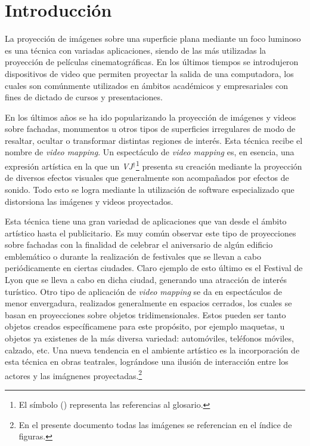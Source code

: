﻿\chapter{Introducción}

La proyección de imágenes sobre una superficie plana mediante un foco luminoso es una técnica con variadas aplicaciones, siendo de las más utilizadas la proyección de películas cinematográficas. En los últimos tiempos se introdujeron dispositivos de video que permiten proyectar la salida de una computadora, los cuales son comúnmente utilizados en ámbitos académicos y empresariales con fines de dictado de cursos y presentaciones.

En los últimos años se ha ido popularizando la proyección de imágenes y videos sobre fachadas, monumentos u otros tipos de superficies irregulares de modo de resaltar, ocultar o transformar distintas regiones de interés. Esta técnica recibe el nombre de \emph{video mapping}. Un espectáculo de \emph{video mapping} es, en esencia, una expresión artística en la que un \emph{VJ}$^\dagger$\footnote{El símbolo (\dag) representa las referencias al glosario.} presenta su creación mediante la proyección de diversos efectos visuales que generalmente son acompañados por efectos de sonido. Todo esto se logra mediante la utilización de software especializado que distorsiona las imágenes y videos proyectados.

Esta técnica tiene una gran variedad de aplicaciones que van desde el ámbito artístico hasta el publicitario. 
Es muy común observar este tipo de proyecciones sobre fachadas con la finalidad de celebrar el aniversario de algún edificio emblemático o durante la realización de festivales que se llevan a cabo periódicamente en ciertas ciudades. Claro ejemplo de esto último es el Festival de Lyon \cite{FestivalLyon} que se lleva a cabo en dicha ciudad, generando una atracción de interés turístico.
Otro tipo de aplicación de \emph{video mapping} se da en espectáculos de menor envergadura, realizados generalmente en espacios cerrados, los cuales se basan en proyecciones sobre objetos tridimensionales. Estos pueden ser tanto objetos creados específicamene para este propósito, por ejemplo maquetas, u objetos ya existenes de la más diversa variedad: automóviles, teléfonos móviles, calzado, etc. Una nueva tendencia en el ambiente artístico es la incorporación de esta técnica en obras teatrales, lográndose una ilusión de interacción entre los actores y las imágnenes proyectadas.\footnote{En el presente documento todas las imágenes se referencian en el índice de figuras.}

